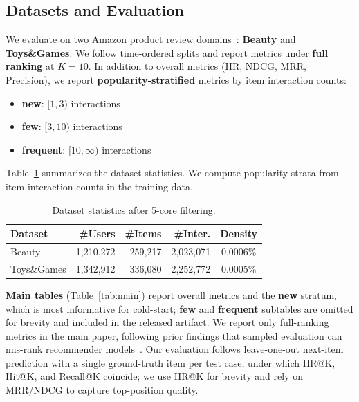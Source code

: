 \documentclass[sigconf,natbib=true,anonymous]{acmart}
\begin{document}
\subsection{Datasets and Evaluation}
We evaluate on two Amazon product review domains~\cite{mcauley2015amazon,ni2019amazon}: \textbf{Beauty} and
\textbf{Toys\&Games}. We follow time-ordered splits and
report metrics under \textbf{full ranking} at $K{=}10$.
In addition to overall metrics (HR, NDCG, MRR, Precision),
we report \textbf{popularity-stratified} metrics by item
interaction counts:
\begin{itemize}[leftmargin=*,itemsep=1pt]
  \item \textbf{new}: $[1,3)$ interactions
  \item \textbf{few}: $[3,10)$ interactions
  \item \textbf{frequent}: $[10,\infty)$ interactions
\end{itemize}
Table~\ref{tab:dataset} summarizes the dataset statistics.
We compute popularity strata from item interaction counts in
the training data.

\begin{table}[h]
\caption{Dataset statistics after 5-core filtering.}
\label{tab:dataset}
\centering
\small
\begin{tabular}{lrrrc}
\toprule
\textbf{Dataset} & \textbf{\#Users} & \textbf{\#Items} & \textbf{\#Inter.} & \textbf{Density} \\
\midrule
Beauty      & 1,210,272 & 259,217 & 2,023,071 & 0.0006\% \\
Toys\&Games & 1,342,912 & 336,080 & 2,252,772 & 0.0005\% \\
\bottomrule
\end{tabular}
\end{table}

\textbf{Main tables} (Table~\ref{tab:main}) report overall metrics and the
\textbf{new} stratum, which is most informative for cold-start;
\textbf{few} and \textbf{frequent} subtables are omitted for brevity
and included in the released artifact.
We report only full-ranking metrics in the
main paper, following prior findings that sampled evaluation
can mis-rank recommender models~\cite{krichene2020sampledmetrics}. Our evaluation
follows leave-one-out next-item prediction with a single
ground-truth item per test case, under which HR@K, Hit@K, and
Recall@K coincide; we use HR@K for brevity and rely on
MRR/NDCG to capture top-position quality.
\end{document}

